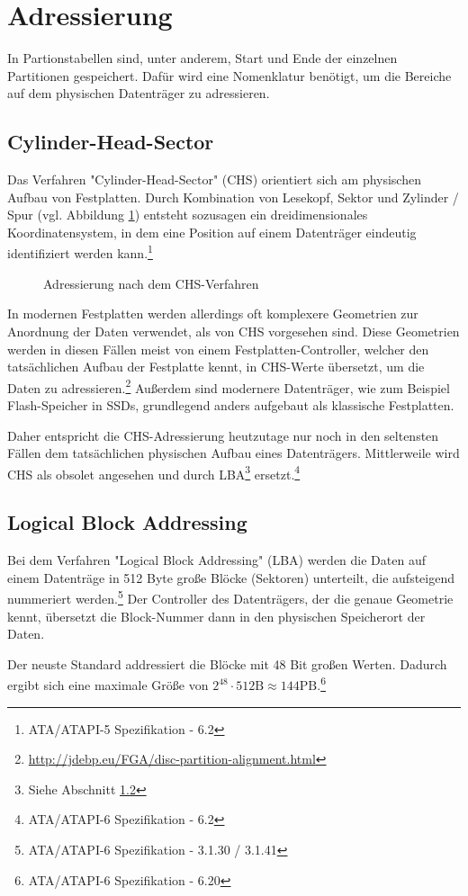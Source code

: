 \section{Adressierung}
In Partionstabellen sind, unter anderem, Start und Ende der einzelnen Partitionen gespeichert.
Dafür wird eine Nomenklatur benötigt, um die Bereiche auf dem physischen Datenträger zu adressieren.

\subsection{Cylinder-Head-Sector}
Das Verfahren "Cylinder-Head-Sector" (CHS) orientiert sich am physischen Aufbau von Festplatten.
Durch Kombination von Lesekopf, Sektor und Zylinder / Spur (vgl. Abbildung \ref{fig:chs}) entsteht sozusagen ein dreidimensionales Koordinatensystem, in dem eine Position auf einem Datenträger eindeutig identifiziert werden kann.\footnote{ATA/ATAPI-5 Spezifikation - 6.2}

\begin{figure}[ht]
    \centering
    \fbox{}
    \caption{Adressierung nach dem CHS-Verfahren}
    \label{fig:chs}
\end{figure}

In modernen Festplatten werden allerdings oft komplexere Geometrien zur Anordnung der Daten verwendet, als von CHS vorgesehen sind.
Diese Geometrien werden in diesen Fällen meist von einem Festplatten-Controller, welcher den tatsächlichen Aufbau der Festplatte kennt, in CHS-Werte übersetzt, um die Daten zu adressieren.\footnote{\url{http://jdebp.eu/FGA/disc-partition-alignment.html}} 
Außerdem sind modernere Datenträger, wie zum Beispiel Flash-Speicher in SSDs, grundlegend anders aufgebaut als klassische Festplatten.

Daher entspricht die CHS-Adressierung heutzutage nur noch in den seltensten Fällen dem tatsächlichen physischen Aufbau eines Datenträgers. 
Mittlerweile wird CHS als obsolet angesehen und durch LBA\footnote{Siehe Abschnitt \ref{sec:LBA}} ersetzt.\footnote{ATA/ATAPI-6 Spezifikation - 6.2}


\subsection{Logical Block Addressing}
\label{sec:LBA}
Bei dem Verfahren "Logical Block Addressing" (LBA) werden die Daten auf einem Datenträge in 512 Byte große Blöcke (Sektoren) unterteilt, die aufsteigend nummeriert werden.\footnote{ATA/ATAPI-6 Spezifikation - 3.1.30 / 3.1.41}
Der Controller des Datenträgers, der die genaue Geometrie kennt, übersetzt die Block-Nummer dann in den physischen Speicherort der Daten.

Der neuste Standard addressiert die Blöcke mit 48 Bit großen Werten.
Dadurch ergibt sich eine maximale Größe von $ 2^{48} \cdot 512 \mathrm{B} \approx 144\mathrm{PB} $.\footnote{ATA/ATAPI-6 Spezifikation - 6.20}
